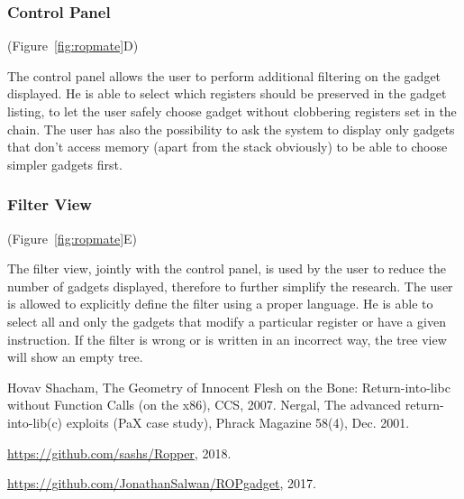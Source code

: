 \documentclass[twocolumn, 11pt]{article}
\begin{document}
\subsubsection{Control Panel}
(Figure~\ref{fig:ropmate}D)

The control panel allows the user to perform additional filtering on the gadget displayed. He is able to select which registers should be preserved in the gadget listing, to let the user safely choose gadget without clobbering registers set in the chain. The user has also the possibility to ask the system to display only gadgets that don't access memory (apart from the stack obviously) to be able to choose simpler gadgets first.

\subsubsection{Filter View}
(Figure~\ref{fig:ropmate}E)

The filter view, jointly with the control panel, is used by the user to reduce the number of gadgets displayed, therefore to further simplify the research. The user is allowed to explicitly define the filter using a proper language. He is able to select all and only the gadgets that modify a particular register or have a given instruction. If the filter is wrong or is written in an incorrect way, the tree view will show an empty tree. 


\begin{thebibliography}{99}
    Hovav Shacham,
    The Geometry of Innocent Flesh on the Bone: Return-into-libc without Function Calls (on the x86),
    CCS,
    2007.
    Nergal,
    The advanced return-into-lib(c) exploits (PaX case study),
    Phrack Magazine 58(4),
    Dec. 2001.

     \url{https://github.com/sashs/Ropper},
    2018.

    \url{https://github.com/JonathanSalwan/ROPgadget},
    2017.

\end{thebibliography}
\end{document}
